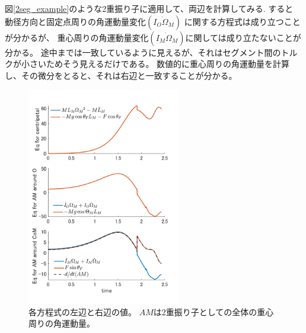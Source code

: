 \documentclass[a4paper,11pt]{jsarticle}
\begin{document}
図\ref{2seg_example}のような2重振り子に適用して、両辺を計算してみる.
すると
動径方向と固定点周りの角運動量変化$(\dot{I_O\Omega_M})$
に関する方程式は成り立つことが分かるが、
重心周りの角運動量変化$(\dot{I_M\Omega_M})$に関しては成り立たないことが分かる。
途中までは一致しているように見えるが、それはセグメント間のトルクが小さいためそう見えるだけである。
数値的に重心周りの角運動量を計算し、その微分をとると、それは右辺と一致することが分かる。
\begin{figure}[h]
  \centering
  \includegraphics[width = 0.6\textwidth]{equation_values.png}
  \caption{
    各方程式の左辺と右辺の値。
    $AM$は2重振り子としての全体の重心周りの角運動量。
  }
  \label{equation_values.png}
\end{figure}
\end{document}
